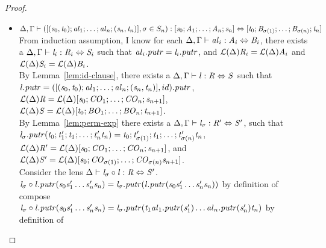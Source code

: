 \begin{lemma}
\begin{proof}
\begin{itemize}
\item$\Delta, \Gamma \vdash ([(\mathit{s}_0,\mathit{t}_0);\mathit{al}_1;\ldots;\mathit{al}_n;(\mathit{s}_n,\mathit{t}_n)],\sigma \in S_n) : [\mathit{s}_0 ; \mathit{A}_1 ; \ldots ; \mathit{A}_n ; \mathit{s}_n] \Leftrightarrow [\mathit{t}_0; \mathit{B}_{\sigma(1)} ; \ldots ; \mathit{B}_{\sigma(n)} ; \mathit{t}_n]$\\
From induction assumption, I know for each $\Delta, \Gamma \vdash \mathit{al}_i : \mathit{A}_i \Leftrightarrow \mathit{B}_i$, there exists a $\Delta, \Gamma \vdash \mathit{l}_i : \mathit{R}_i \Leftrightarrow \mathit{S}_i$ such that $\mathit{al}_i.\mathit{putr}=\mathit{l}_i.\mathit{putr}$,
and $\mathcal{L}(\Delta){\mathit{R}_i}=\mathcal{L}(\Delta){\mathit{A}_i}$ and $\mathcal{L}(\Delta){\mathit{S}_i}=\mathcal{L}(\Delta){\mathit{B}_i}$.\\
By Lemma~\ref{lem:id-clause}, there exists a $\Delta, \Gamma \vdash \mathit{l} : \mathit{R} \Leftrightarrow \mathit{S}$ such that $\mathit{l}.\mathit{putr}=([(\mathit{s}_0,\mathit{t}_0);\mathit{al}_1;\ldots;\mathit{al}_n;(\mathit{s}_n,\mathit{t}_n)],id).\mathit{putr}$,
$\mathcal{L}(\Delta){\mathit{R}}=\mathcal{L}(\Delta){[\mathit{s}_0;\mathit{CO}_1;\ldots;\mathit{CO}_n;\mathit{s}_{n+1}]}$,
$\mathcal{L}(\Delta){\mathit{S}}=\mathcal{L}(\Delta){[\mathit{t}_0;\mathit{BO}_1;\ldots;\mathit{BO}_n;\mathit{t}_{n+1}]}$.\\
By Lemma~\ref{lem:perm-exp} there exists a $\Delta, \Gamma \vdash \mathit{l}_{\sigma} : \mathit{R}' \Leftrightarrow \mathit{S}'$,
such that $\mathit{l}_{\sigma}.\mathit{putr}(\mathit{t}_0;\mathit{t}_1';\mathit{t}_1;\ldots;\mathit{t}_n'\mathit{t}_n)=\mathit{t}_0;\mathit{t}_{\sigma(1)}';\mathit{t}_1;\ldots;\mathit{t}_{\sigma(n)}'\mathit{t}_n$,
$\mathcal{L}(\Delta){\mathit{R}'}=\mathcal{L}(\Delta){[\mathit{s}_0;\mathit{CO}_1;\ldots;\mathit{CO}_n;\mathit{s}_{n+1}]}$, and
$\mathcal{L}(\Delta){\mathit{S}'}=\mathcal{L}(\Delta){[\mathit{s}_0;\mathit{CO}_{\sigma(1)};\ldots;\mathit{CO}_{\sigma(n)}\mathit{s}_{n+1}]}$.\\
Consider the lens $\Delta \vdash \mathit{l}_{\sigma} \circ \mathit{l} : \mathit{R} \Leftrightarrow \mathit{S}'$.\\
$\mathit{l}_{\sigma} \circ \mathit{l}.\mathit{putr}(\mathit{s}_0\mathit{s}_1'\ldots\mathit{s}_n'\mathit{s}_n)=\mathit{l}_{\sigma}.\mathit{putr}(\mathit{l}.\mathit{putr}(\mathit{s}_0\mathit{s}_1'\ldots\mathit{s}_n'\mathit{s}_n))$ by definition of compose\\
$\mathit{l}_{\sigma} \circ \mathit{l}.\mathit{putr}(\mathit{s}_0\mathit{s}_1'\ldots\mathit{s}_n'\mathit{s}_n)=\mathit{l}_{\sigma}.\mathit{putr}(\mathit{t}_1\mathit{al}_1.\mathit{putr}(\mathit{s}_1')\ldots\mathit{al}_n.\mathit{putr}(\mathit{s}_n')\mathit{t}_n)$ by definition of \Lens{}\\

\end{itemize}
\end{proof}
\end{lemma}
